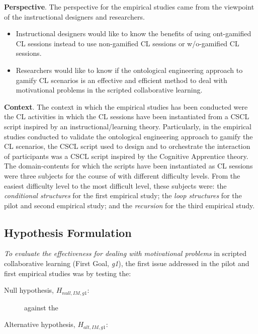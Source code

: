 \textbf{Perspective}.
The perspective for the empirical studies came from the viewpoint of the instructional designers and researchers.

\begin{itemize}
\item
Instructional designers would like to know the benefits of using ont-gamified CL sessions instead to use non-gamified CL sessions or w/o-gamified CL sessions.

\item
Researchers would like to know if the ontological engineering approach to gamify CL scenarios is an effective and efficient method to deal with motivational problems in the scripted collaborative learning.
\end{itemize}

\textbf{Context}.
The context in which the empirical studies has been conducted were the CL activities in which the CL sessions have been instantiated from a CSCL script inspired by an instructional/learning theory.
Particularly, in the empirical studies conducted to validate the ontological engineering approach to gamify the CL scenarios, the CSCL script used to design and to orchestrate the interaction of participants was a CSCL script inspired by the Cognitive Apprentice theory.
The domain-contents for which the scripts have been instantiated as CL sessions were three subjects for the course of  with different difficulty levels.
From the easiest difficulty level to the most difficult level, these subjects were:
the \emph{conditional structures} for the first empirical study;
the \emph{loop structures} for the pilot and second empirical study; and
the \emph{recursion} for the third empirical study.


\subsection{Hypothesis Formulation}

\emph{To evaluate the effectiveness for dealing with motivational problems} in scripted collaborative learning (First Goal, \emph{g1}), the first issue addressed in the pilot and first empirical studies was
 by testing the:

\begin{description}
\item[Null hypothesis, $H_{null,IM,g1}$:]
 against the
\item[Alternative hypothesis, $H_{alt,IM,g1}$:]
\end{description}


